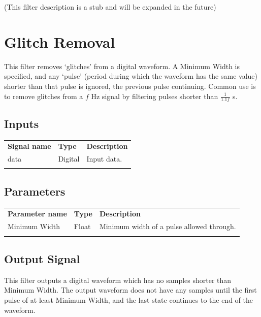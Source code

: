 (This filter description is a stub and will be expanded in the future)

\pagebreak
\section{Glitch Removal}

This filter removes `glitches' from a digital waveform. A Minimum Width is specified, and any `pulse' (period during which the waveform has the same value) shorter than that pulse is ignored, the previous pulse continuing. Common use is to remove glitches from a $f$ Hz signal by filtering pulses shorter than $\frac{1}{1.1f}$ s.

\subsection{Inputs}

\begin{tabularx}{16cm}{llX}
\thickhline
\textbf{Signal name} & \textbf{Type} & \textbf{Description} \\
\thickhline
data & Digital & Input data. \\
\thickhline
\end{tabularx}

\subsection{Parameters}

\begin{tabularx}{16cm}{llX}
\thickhline
\textbf{Parameter name} & \textbf{Type} & \textbf{Description} \\
\thickhline
Minimum Width & Float & Minimum width of a pulse allowed through.\\
\thickhline
\end{tabularx}

\subsection{Output Signal}

This filter outputs a digital waveform which has no samples shorter than Minimum Width. The output waveform does not have any samples until the first pulse of at least Minimum Width, and the last state continues to the end of the waveform.

\pagebreak
